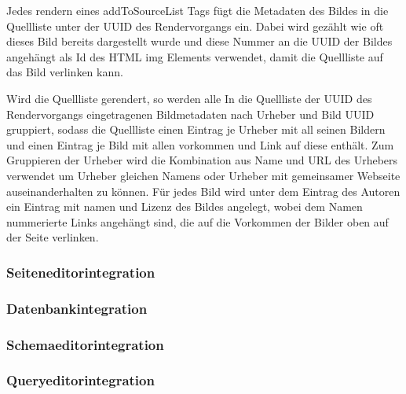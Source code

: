 Jedes rendern eines addToSourceList Tags fügt die Metadaten des Bildes in
die Quellliste unter der UUID des Rendervorgangs ein. Dabei wird gezählt wie oft
dieses Bild bereits dargestellt wurde und diese Nummer an die UUID der Bildes
angehängt als Id des HTML img Elements verwendet, damit die Quellliste auf das
Bild verlinken kann.

Wird die Quellliste gerendert, so werden alle In die Quellliste der UUID des
Rendervorgangs eingetragenen Bildmetadaten nach Urheber und Bild UUID gruppiert,
sodass die Quellliste einen Eintrag je Urheber mit all seinen Bildern und einen
Eintrag je Bild mit allen vorkommen und Link auf diese enthält. Zum Gruppieren
der Urheber wird die Kombination aus Name und URL des Urhebers verwendet um
Urheber gleichen Namens oder Urheber mit gemeinsamer Webseite auseinanderhalten
zu können. Für jedes Bild wird unter dem Eintrag des Autoren ein Eintrag mit
namen und Lizenz des Bildes angelegt, wobei dem Namen nummerierte Links
angehängt sind, die auf die Vorkommen der Bilder oben auf der Seite verlinken.

\subsubsection{Seiteneditorintegration}



\subsubsection{Datenbankintegration}



\subsubsection{Schemaeditorintegration}



\subsubsection{Queryeditorintegration}



